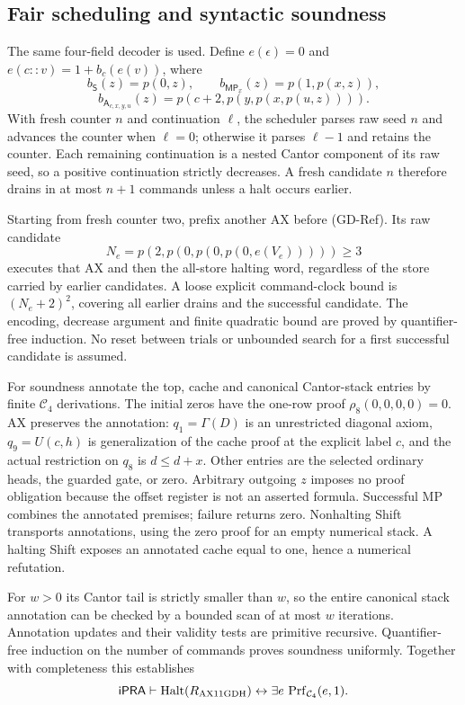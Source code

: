 \subsection{Fair scheduling and syntactic soundness}

The same four-field decoder is used. Define
$e(\epsilon)=0$ and $e(c::v)=1+b_c(e(v))$, where
\[
 b_{\mathsf S}(z)=p(0,z),\qquad
 b_{\mathsf{MP}_x}(z)=p(1,p(x,z)),
\]
\[
 b_{\mathsf A_{c,x,y,u}}(z)=p(c+2,p(y,p(x,p(u,z)))).
\]
With fresh counter $n$ and continuation $\ell$, the scheduler parses
raw seed $n$ and advances the counter when $\ell=0$; otherwise it
parses $\ell-1$ and retains the counter. Each remaining continuation
is a nested Cantor component of its raw seed, so a positive continuation
strictly decreases. A fresh candidate $n$ therefore drains in at most
$n+1$ commands unless a halt occurs earlier.

Starting from fresh counter two, prefix another AX before (GD-Ref).
Its raw candidate
\[
 N_e=p(2,p(0,p(0,p(0,e(V_e)))))\ge3
\]
executes that AX and then the all-store halting word, regardless of the
store carried by earlier candidates. A loose explicit command-clock
bound is $(N_e+2)^2$, covering all earlier drains and the successful
candidate. The encoding, decrease argument and finite quadratic bound
are proved by quantifier-free induction. No reset between trials or
unbounded search for a first successful candidate is assumed.

For soundness annotate the top, cache and canonical Cantor-stack entries
by finite $\mathcal C_4$ derivations. The initial zeros have the one-row
proof $\rho_8(0,0,0,0)=0$. AX preserves the annotation: $q_1=\Gamma(D)$
is an unrestricted diagonal axiom, $q_9=U(c,h)$ is generalization of
the cache proof at the explicit label $c$, and the actual restriction
on $q_8$ is $d\le d+x$. Other entries are the selected ordinary heads,
the guarded gate, or zero. Arbitrary outgoing $z$ imposes no proof
obligation because the offset register is not an asserted formula.
Successful MP combines the annotated premises; failure returns zero.
Nonhalting Shift transports annotations, using the zero proof for an
empty numerical stack. A halting Shift exposes an annotated cache equal
to one, hence a numerical refutation.

For $w>0$ its Cantor tail is strictly smaller than $w$, so the entire
canonical stack annotation can be checked by a bounded scan of at most
$w$ iterations. Annotation updates and their validity tests are primitive
recursive. Quantifier-free induction on the number of commands proves
soundness uniformly. Together with completeness this establishes
\[
 \mathsf{iPRA}\vdash
   \operatorname{Halt}(R_{\rm AX11GDH})
        \leftrightarrow\exists e\,\operatorname{Prf}_{\mathcal C_4}(e,1).
\]


